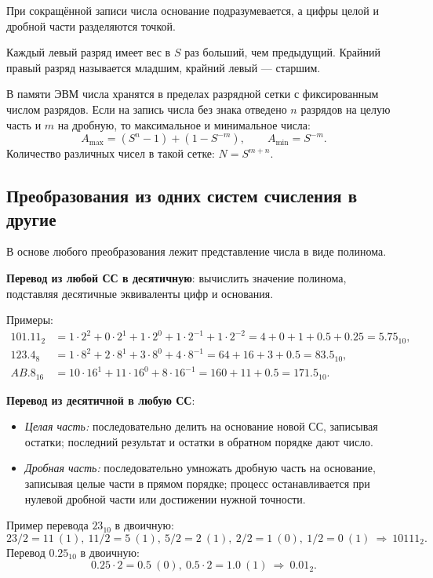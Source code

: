 \documentclass[a4paper,14pt]{report}
\begin{document}
При сокращённой записи числа основание подразумевается, а цифры целой и дробной части разделяются точкой.

Каждый левый разряд имеет вес в $S$ раз больший, чем предыдущий. Крайний правый разряд называется младшим, крайний левый --- старшим.

В памяти ЭВМ числа хранятся в пределах разрядной сетки с фиксированным числом разрядов. Если на запись числа без знака отведено $n$ разрядов на целую часть и $m$ на дробную, то максимальное и минимальное числа:
\[
A_{\max} = (S^n - 1) + (1 - S^{-m}), \qquad A_{\min} = S^{-m}.
\]
Количество различных чисел в такой сетке: $N = S^{m+n}$.

\subsection{Преобразования из одних систем счисления в другие}
В основе любого преобразования лежит представление числа в виде полинома.

\textbf{Перевод из любой СС в десятичную}: вычислить значение полинома, подставляя десятичные эквиваленты цифр и основания.

Примеры:
\begin{align*}
101.11_2 &= 1\cdot2^2 + 0\cdot2^1 + 1\cdot2^0 + 1\cdot2^{-1} + 1\cdot2^{-2} = 4+0+1+0.5+0.25 = 5.75_{10},\\
123.4_8 &= 1\cdot8^2 + 2\cdot8^1 + 3\cdot8^0 + 4\cdot8^{-1} = 64+16+3+0.5 = 83.5_{10},\\
AB.8_{16} &= 10\cdot16^1 + 11\cdot16^0 + 8\cdot16^{-1} = 160+11+0.5 = 171.5_{10}.
\end{align*}

\textbf{Перевод из десятичной в любую СС}:
\begin{itemize}
    \item \textit{Целая часть:} последовательно делить на основание новой СС, записывая остатки; последний результат и остатки в обратном порядке дают число.
    \item \textit{Дробная часть:} последовательно умножать дробную часть на основание, записывая целые части в прямом порядке; процесс останавливается при нулевой дробной части или достижении нужной точности.
\end{itemize}

Пример перевода $23_{10}$ в двоичную:
\[
23/2 = 11\ (1),\ 11/2=5\ (1),\ 5/2=2\ (1),\ 2/2=1\ (0),\ 1/2=0\ (1) \ \Rightarrow\ 10111_2.
\]
Перевод $0.25_{10}$ в двоичную:
\[
0.25\cdot2=0.5\ (0),\ 0.5\cdot2=1.0\ (1) \ \Rightarrow\ 0.01_2.
\]
\end{document}
